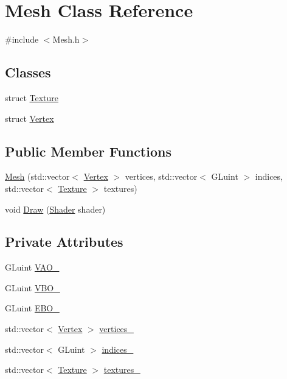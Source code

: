 \hypertarget{classMesh}{}\section{Mesh Class Reference}
\label{classMesh}


{\ttfamily \#include $<$Mesh.\+h$>$}

\subsection*{Classes}
\begin{DoxyCompactItemize}
\item 
struct \mbox{\hyperlink{structMesh_1_1Texture}{Texture}}
\item 
struct \mbox{\hyperlink{structMesh_1_1Vertex}{Vertex}}
\end{DoxyCompactItemize}
\subsection*{Public Member Functions}
\begin{DoxyCompactItemize}
\item 
\mbox{\hyperlink{classMesh_af1baf95f510199fd2b3631e9daae79ce}{Mesh}} (std\+::vector$<$ \mbox{\hyperlink{structMesh_1_1Vertex}{Vertex}} $>$ vertices, std\+::vector$<$ G\+Luint $>$ indices, std\+::vector$<$ \mbox{\hyperlink{structMesh_1_1Texture}{Texture}} $>$ textures)
\item 
void \mbox{\hyperlink{classMesh_a143c8d7c179801c6377853db26d4a19f}{Draw}} (\mbox{\hyperlink{classShader}{Shader}} shader)
\end{DoxyCompactItemize}
\subsection*{Private Attributes}
\begin{DoxyCompactItemize}
\item 
G\+Luint \mbox{\hyperlink{classMesh_afd9536b3c00a08e785c66bfbe9d8f576}{V\+A\+O\+\_\+}}
\item 
G\+Luint \mbox{\hyperlink{classMesh_aa0986a27c55d8ba1ecae7950bcc68b24}{V\+B\+O\+\_\+}}
\item 
G\+Luint \mbox{\hyperlink{classMesh_a4748e3b51532876095f2695e3cb57208}{E\+B\+O\+\_\+}}
\item 
std\+::vector$<$ \mbox{\hyperlink{structMesh_1_1Vertex}{Vertex}} $>$ \mbox{\hyperlink{classMesh_a986edf1ab1d37e517ff8adc928519528}{vertices\+\_\+}}
\item 
std\+::vector$<$ G\+Luint $>$ \mbox{\hyperlink{classMesh_ad0141809802020d763f082258a185d0f}{indices\+\_\+}}
\item 
std\+::vector$<$ \mbox{\hyperlink{structMesh_1_1Texture}{Texture}} $>$ \mbox{\hyperlink{classMesh_aac6b1a84f27f003bda8c4e48ffa4f475}{textures\+\_\+}}
\end{DoxyCompactItemize}


